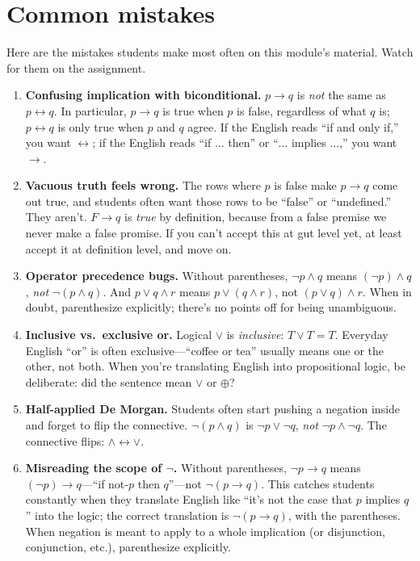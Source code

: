 \documentclass[11pt]{article}
\begin{document}
\section{Common mistakes}

Here are the mistakes students make most often on this module's material. Watch for them on the assignment.

\begin{enumerate}
  \item \textbf{Confusing implication with biconditional.} $p \to q$ is \emph{not} the same as $p \leftrightarrow q$. In particular, $p \to q$ is true when $p$ is false, regardless of what $q$ is; $p \leftrightarrow q$ is only true when $p$ and $q$ agree. If the English reads ``if and only if,'' you want $\leftrightarrow$; if the English reads ``if $\ldots$ then'' or ``$\ldots$ implies $\ldots$,'' you want $\to$.
  \item \textbf{Vacuous truth feels wrong.} The rows where $p$ is false make $p \to q$ come out true, and students often want those rows to be ``false'' or ``undefined.'' They aren't. $F \to q$ is \emph{true} by definition, because from a false premise we never make a false promise. If you can't accept this at gut level yet, at least accept it at definition level, and move on.
  \item \textbf{Operator precedence bugs.} Without parentheses, $\lnot p \wedge q$ means $(\lnot p) \wedge q$, \emph{not} $\lnot(p \wedge q)$. And $p \vee q \wedge r$ means $p \vee (q \wedge r)$, not $(p \vee q) \wedge r$. When in doubt, parenthesize explicitly; there's no points off for being unambiguous.
  \item \textbf{Inclusive vs.\ exclusive or.} Logical $\vee$ is \emph{inclusive}: $T \vee T = T$. Everyday English ``or'' is often exclusive---``coffee or tea'' usually means one or the other, not both. When you're translating English into propositional logic, be deliberate: did the sentence mean $\vee$ or $\oplus$?
  \item \textbf{Half-applied De Morgan.} Students often start pushing a negation inside and forget to flip the connective. $\lnot(p \wedge q)$ is $\lnot p \vee \lnot q$, \emph{not} $\lnot p \wedge \lnot q$. The connective flips: $\wedge \leftrightarrow \vee$.
  \item \textbf{Misreading the scope of $\lnot$.} Without parentheses, $\lnot p \to q$ means $(\lnot p) \to q$---``if not-$p$ then $q$''---not $\lnot(p \to q)$. This catches students constantly when they translate English like ``it's not the case that $p$ implies $q$'' into the logic; the correct translation is $\lnot(p \to q)$, with the parentheses. When negation is meant to apply to a whole implication (or disjunction, conjunction, etc.), parenthesize explicitly.
\end{enumerate}
\end{document}
